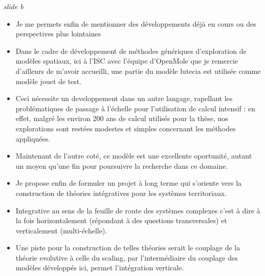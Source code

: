 \documentclass[12pt]{article}
\begin{document}
\newpage

\textit{slide b}

\begin{itemize}
	\item Je me permets enfin de mentionner des développements déjà en cours ou des perspectives plus lointaines
	\item Dans le cadre de développement de méthodes génériques d'exploration de modèles spatiaux, ici à l'ISC avec l'équipe d'OpenMole que je remercie d'ailleurs de m'avoir accueilli, une partie du modèle lutecia est utilisée comme modèle jouet de test. 
	\item Ceci nécessite un developpement dans un autre langage, rapellant les problématiques de passage à l'échelle pour l'utilisation de calcul intensif : en effet, malgré les environ 200 ans de calcul utilisés pour la thèse, nos explorations sont restées modestes et simples concernant les méthodes appliquées.
	\item Maintenant de l'autre coté, ce modèle est une excellente oportunité, autant un moyen qu'une fin pour poursuivre la recherche dans ce domaine.
	\item Je propose enfin de formuler un projet à long terme qui s'oriente vers la construction de théories intégratives pour les systèmes territoriaux.
	\item Integrative au sens de la feuille de route des systèmes complexes c'est à dire à la fois horizontalement (répondant à des questions transversales) et verticalement (multi-échelle).
	\item Une piste pour la construction de telles théories serait le couplage de la théorie evolutive à celle du scaling, par l'intermédiaire du couplage des modèles développés ici, permet l'intégration verticale.
\end{itemize}
\end{document}
